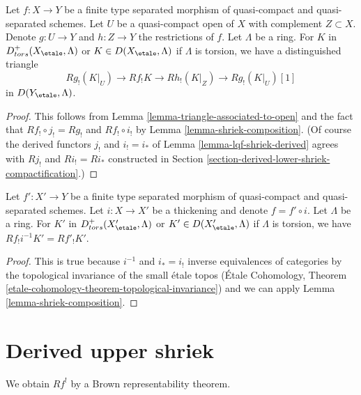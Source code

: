 \begin{lemma}
\label{lemma-relative-triangle-associated-to-open}
Let $f : X \to Y$ be a finite type separated morphism of quasi-compact and
quasi-separated schemes. Let $U$ be a quasi-compact open of $X$ with
complement $Z \subset X$.  Denote $g : U \to Y$ and $h : Z \to Y$
the restrictions of $f$. Let $\Lambda$ be a ring.
For $K$ in $D^+_{tors}(X_\etale, \Lambda)$ or $K \in D(X_\etale, \Lambda)$
if $\Lambda$ is torsion, we have a distinguished triangle
$$
Rg_!(K|_U) \to
Rf_!K \to
Rh_!(K|_Z) \to
Rg_!(K|_U)[1]
$$
in $D(Y_\etale, \Lambda)$.
\end{lemma}

\begin{proof}
This follows from
Lemma \ref{lemma-triangle-associated-to-open}
and the fact that $Rf_! \circ j_! = Rg_!$ and $Rf_! \circ i_!$ by
Lemma \ref{lemma-shriek-composition}.
(Of course the derived functors $j_!$ and $i_! = i_*$ of
Lemma \ref{lemma-lqf-shriek-derived} agrees with
$Rj_!$ and $Ri_! = Ri_*$ constructed in
Section \ref{section-derived-lower-shriek-compactification}.)
\end{proof}

\begin{lemma}
\label{lemma-shriek-and-thickening}
Let $f' : X' \to Y$ be a finite type separated morphism of quasi-compact and
quasi-separated schemes. Let $i : X \to X'$ be a thickening and
denote $f = f' \circ i$. Let $\Lambda$ be a ring.
For $K'$ in $D^+_{tors}(X'_\etale, \Lambda)$ or $K' \in D(X'_\etale, \Lambda)$
if $\Lambda$ is torsion, we have $Rf_!i^{-1}K' = Rf'_!K'$.
\end{lemma}

\begin{proof}
This is true because $i^{-1}$ and $i_* = i_!$ inverse equivalences
of categories by the topological invariance of the small \'etale topos
(\'Etale Cohomology, Theorem
\ref{etale-cohomology-theorem-topological-invariance})
and we can apply
Lemma \ref{lemma-shriek-composition}.
\end{proof}









\section{Derived upper shriek}
\label{section-derived-upper-shriek}

\noindent
We obtain $Rf^!$ by a Brown representability theorem.

